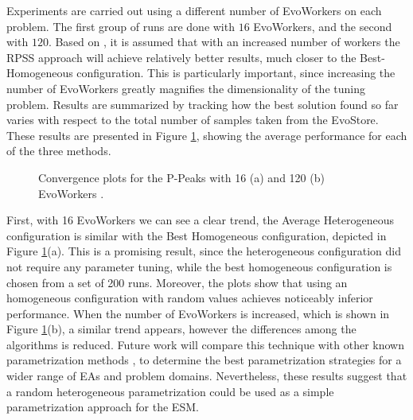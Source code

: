Experiments are carried out using a different number of EvoWorkers on each problem.
The first group of runs are done with $16$ EvoWorkers, and the second with $120$.
Based on \cite{fuku1,fuku2}, it is assumed that with an increased number of workers the RPSS approach will achieve relatively better results, much closer to
the Best-Homogeneous configuration.
This is particularly important, since increasing the number of EvoWorkers greatly magnifies the dimensionality of the tuning problem.
Results are summarized by tracking how the best solution found so far varies with respect to the total
number of samples taken from the EvoStore.
These results are presented in Figure \ref{fig:PPeaks}, showing the average performance for each of the three methods.

\begin{figure}[t]
    \centering
    \caption{Convergence plots for the P-Peaks with 16 (a) and 120 (b)
      EvoWorkers .}
    \label{fig:PPeaks}
\end{figure}



First, with 16 EvoWorkers we can see a clear trend, the Average Heterogeneous configuration is similar with the Best Homogeneous configuration,
depicted in Figure \ref{fig:PPeaks}(a).
This is a promising result, since the heterogeneous configuration did not require any parameter tuning, while the best homogeneous configuration
is chosen from a set of 200 runs.
Moreover, the plots show that using an homogeneous configuration with random values achieves noticeably inferior performance.
When the number of EvoWorkers is increased, which is shown in Figure \ref{fig:PPeaks}(b), a similar trend appears,
however the differences among the algorithms is reduced.
Future work will compare this technique with other known parametrization methods \cite{cantu}, to determine the best
parametrization strategies for a wider range of EAs and problem domains. 
Nevertheless, these results suggest that a random heterogeneous parametrization could be used as a simple parametrization approach for the ESM.

